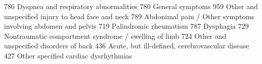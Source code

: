 786 \markdownRendererPipe{} Dyspnea and respiratory abnormalities 780 \markdownRendererPipe{} General symptoms 959 \markdownRendererPipe{} Other and unspecified injury to head face and neck 789 \markdownRendererPipe{} Abdonimal pain / Other symptoms involving abdomen and pelvis 719 \markdownRendererPipe{} Palindromic rheumatism 787 \markdownRendererPipe{} Dysphagia 729 \markdownRendererPipe{} Nontraumatic compartment syndrome / swelling of limb 724 \markdownRendererPipe{} Other and unspecified disorders of back 436 \markdownRendererPipe{} Acute, but ill-defined, cerebrovascular disease 427 \markdownRendererPipe{} Other specified cardiac dysrhythmias\relax